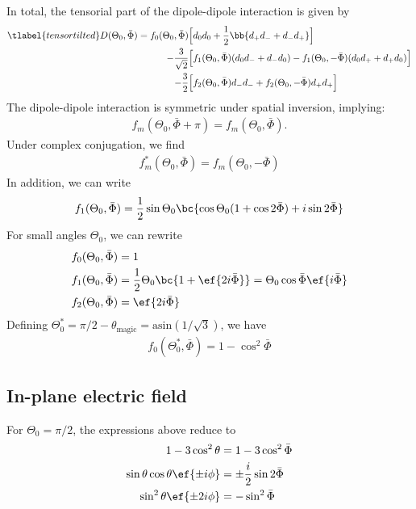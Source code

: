 In total, the tensorial part of the dipole-dipole interaction is given by
\begin{align} \tlabel{tensortilted}
    D(\Theta_0, \bar\Phi) = f_0(\Theta_0, \bar \Phi) &\Big[d_0 d_0 + \frac{1}{2}\bb{d_+ d_- + d_- d_+} \Big] \\
      \qquad-\frac{3}{\sqrt{2}} &\Big[ f_1(\Theta_0, \bar \Phi)  (d_0 d_- + d_- d_0) - f_1(\Theta_0, -\bar \Phi) (d_0 d_+ + d_+ d_0) \Big]\\
      \qquad-\frac{3}{2} &\Big[ f_2(\Theta_0, \bar \Phi) d_- d_- + f_2(\Theta_0, -\bar \Phi) d_+ d_+\Big]
\end{align}
The dipole-dipole interaction is symmetric under spatial inversion, implying:
\begin{align}
    f_m(\Theta_0, \bar \Phi + \pi) = f_m(\Theta_0, \bar \Phi).
\end{align}
Under complex conjugation, we find
\begin{align}
    f_m^*(\Theta_0, \bar \Phi) = f_m(\Theta_0, -\bar \Phi)
\end{align}
In addition, we can write
\begin{align}
    f_1(\Theta_0, \bar \Phi) = \frac{1}{2} \sin \Theta_0 \bc{\cos \Theta_0 (1+\cos 2\bar \Phi) + i \sin 2 \bar \Phi}
\end{align}
For small angles $\Theta_0$, we can rewrite
\begin{align}
    f_0(\Theta_0, \bar \Phi) &= 1 \\
    f_1(\Theta_0, \bar \Phi) &= \frac{1}{2} \Theta_0 \bc{1+\ef{2 i \bar \Phi}}=\Theta_0 \cos \bar \Phi \ef{i \bar \Phi}\\
    f_2(\Theta_0, \bar \Phi) &= \ef{2 i \bar \Phi}
\end{align}
Defining $\Theta_0^* = \pi/2 - \theta_\text{magic}=\text{asin}(1/\sqrt{3})$, we have
\begin{align}
    f_0(\Theta_0^*, \bar \Phi) = 1-\cos^2\bar \Phi
\end{align}

\subsection{In-plane electric field}
For $\Theta_0=\pi/2$, the expressions above reduce to
\begin{align}
    1-3\cos^2\theta &= 1-3\cos^2\bar\Phi \\
    \sin\theta\cos\theta \ef{\pm i\phi} &= \pm \frac{i}{2} \sin 2\bar\Phi \\
    \sin^2\theta \ef{\pm 2i\phi} &= - \sin^2 \bar\Phi
\end{align}

